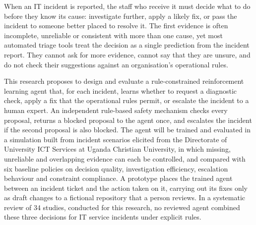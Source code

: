 When an IT incident is reported, the staff who receive it must decide what to do before they know its cause: investigate further, apply a likely fix, or pass the incident to someone better placed to resolve it. The first evidence is often incomplete, unreliable or consistent with more than one cause, yet most automated triage tools treat the decision as a single prediction from the incident report. They cannot ask for more evidence, cannot say that they are unsure, and do not check their suggestions against an organisation's operational rules.

This research proposes to design and evaluate a rule-constrained reinforcement learning agent that, for each incident, learns whether to request a diagnostic check, apply a fix that the operational rules permit, or escalate the incident to a human expert. An independent rule-based safety mechanism checks every proposal, returns a blocked proposal to the agent once, and escalates the incident if the second proposal is also blocked. The agent will be trained and evaluated in a simulation built from incident scenarios elicited from the Directorate of University ICT Services at Uganda Christian University, in which missing, unreliable and overlapping evidence can each be controlled, and compared with six baseline policies on decision quality, investigation efficiency, escalation behaviour and constraint compliance. A prototype places the trained agent between an incident ticket and the action taken on it, carrying out its fixes only as draft changes to a fictional repository that a person reviews. In a systematic review of 34 studies, conducted for this research, no reviewed agent combined these three decisions for IT service incidents under explicit rules.
